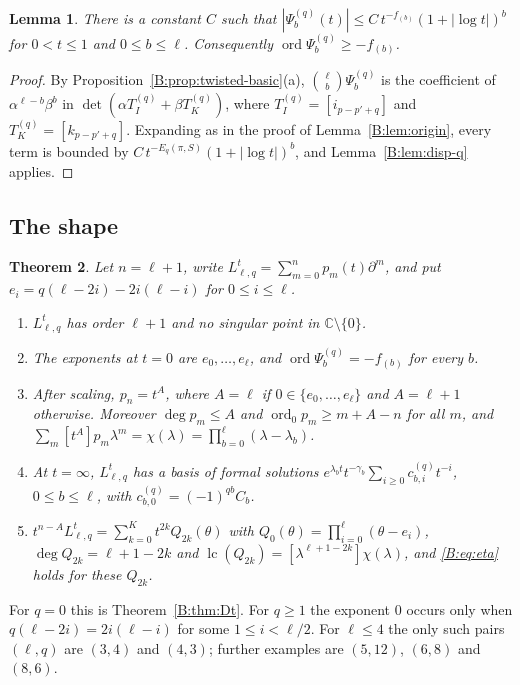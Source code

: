 \documentclass[11pt,a4paper]{article}
\newtheorem{theorem}{Theorem}[section]
\newtheorem{lemma}[theorem]{Lemma}
\theoremstyle{definition}
\theoremstyle{remark}
\newcommand{\C}{\mathbb C}
\DeclareMathOperator{\ord}{ord}
\DeclareMathOperator{\lc}{lc}
\numberwithin{equation}{section}
\begin{document}
\begin{lemma}\label{B:lem:origin-q}
There is a constant $C$ such that $|\Psi^{(q)}_b(t)|\le C\,t^{-f_{(b)}}(1+|\log t|)^b$ for $0<t\le1$ and $0\le b\le\ell$. Consequently $\ord\Psi^{(q)}_b\ge-f_{(b)}$.
\end{lemma}

\begin{proof}
By Proposition~\ref{B:prop:twisted-basic}(a), $\binom{\ell}b\Psi^{(q)}_b$ is the coefficient of $\alpha^{\ell-b}\beta^b$ in $\det(\alpha T^{(q)}_I+\beta T^{(q)}_K)$, where $T^{(q)}_I=[i_{p-p'+q}]$ and $T^{(q)}_K=[k_{p-p'+q}]$. Expanding as in the proof of Lemma~\ref{B:lem:origin}, every term is bounded by $C\,t^{-E_q(\pi,S)}(1+|\log t|)^b$, and Lemma~\ref{B:lem:disp-q} applies.
\end{proof}

\subsection{The shape}

\begin{theorem}\label{B:thm:Dtq}
Let $n=\ell+1$, write $L^t_{\ell,q}=\sum_{m=0}^{n}p_m(t)\partial^m$, and put $e_i=q(\ell-2i)-2i(\ell-i)$ for $0\le i\le\ell$.
\begin{enumerate}
\item[(i)] $L^t_{\ell,q}$ has order $\ell+1$ and no singular point in $\C\setminus\{0\}$.
\item[(ii)] The exponents at $t=0$ are $e_0,\dots,e_\ell$, and $\ord\Psi^{(q)}_b=-f_{(b)}$ for every $b$.
\item[(iii)] After scaling, $p_n=t^A$, where $A=\ell$ if $0\in\{e_0,\dots,e_\ell\}$ and $A=\ell+1$ otherwise. Moreover $\deg p_m\le A$ and $\ord_0p_m\ge m+A-n$ for all $m$, and $\sum_m[t^A]p_m\lambda^m=\chi(\lambda)=\prod_{b=0}^{\ell}(\lambda-\lambda_b)$.
\item[(iv)] At $t=\infty$, $L^t_{\ell,q}$ has a basis of formal solutions $e^{\lambda_bt}t^{-\gamma_b}\sum_{i\ge0}c^{(q)}_{b,i}t^{-i}$, $0\le b\le\ell$, with $c^{(q)}_{b,0}=(-1)^{qb}C_b$.
\item[(v)] $t^{n-A}L^t_{\ell,q}=\sum_{k=0}^{K}t^{2k}Q_{2k}(\theta)$ with $Q_0(\theta)=\prod_{i=0}^{\ell}(\theta-e_i)$, $\deg Q_{2k}=\ell+1-2k$ and $\lc(Q_{2k})=[\lambda^{\ell+1-2k}]\chi(\lambda)$, and \eqref{B:eq:eta} holds for these $Q_{2k}$.
\end{enumerate}
\end{theorem}

For $q=0$ this is Theorem~\ref{B:thm:Dt}. For $q\ge1$ the exponent $0$ occurs only when $q(\ell-2i)=2i(\ell-i)$ for some $1\le i<\ell/2$. For $\ell\le4$ the only such pairs $(\ell,q)$ are $(3,4)$ and $(4,3)$; further examples are $(5,12)$, $(6,8)$ and $(8,6)$.
\end{document}
